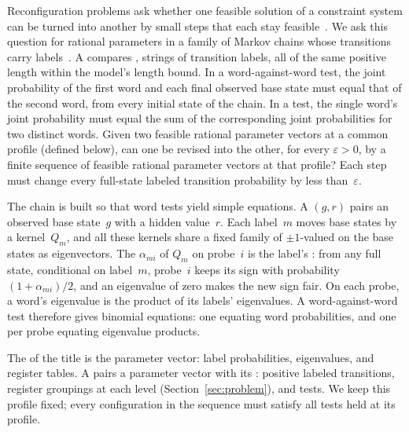Reconfiguration problems ask whether one feasible solution of a
constraint system can be turned into another by small steps that each
stay feasible~\cite{gopalan,hearndemaine,ito}.
We ask this question for rational parameters in a family of Markov chains whose
transitions carry labels~\cite[Definition~1]{chenkiefer2014}.
A  compares , strings of transition
labels, all of the same positive length within the model's length bound.
In a word-against-word test, the joint probability of the first word
and each final observed base state must equal that of the second word,
from every initial state of the chain.
In a  test, the single word's joint probability
must equal the sum of the corresponding joint probabilities for two distinct
words. Given two feasible rational parameter vectors at a common profile
(defined below),
can one be revised into the other, for every $\varepsilon>0$, by a finite
sequence of feasible rational parameter vectors at that profile? Each step
must change every full-state labeled transition probability by less
than~$\varepsilon$.

The chain is built so that word tests yield simple equations. A
 $(g,r)$ pairs an observed base state~$g$ with a hidden
 value~$r$. Each label~$m$ moves base states by a
kernel~$Q_m$, and all these kernels share a fixed family of $\pm1$-valued
 on the base states as eigenvectors. The 
$\alpha_{mi}$ of $Q_m$ on probe~$i$ is the label's :
from any full state, conditional on label~$m$, probe~$i$ keeps its sign with
probability $(1+\alpha_{mi})/2$, and an eigenvalue of zero makes the new sign
fair. On each probe, a word's eigenvalue is the product of its labels'
eigenvalues. A word-against-word test therefore gives binomial equations: one
equating word probabilities, and one  per probe
equating eigenvalue products.

The  of the title is the parameter vector: label
probabilities, eigenvalues, and register tables. A 
pairs a parameter vector with its : positive labeled
transitions, register groupings at each level (Section~\ref{sec:problem}),
and  tests.
We keep this profile fixed; every configuration in the sequence must satisfy
all tests held at its profile.

